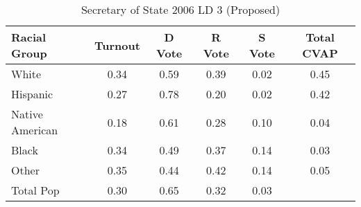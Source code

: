 \begin{table}[htb]
\begin{center}
\caption{Secretary of State 2006 LD 3 (Proposed)}
\label{sos06_cvap_ld_3}
\begin{tabular}{lccccc}
  \hline
Racial Group & Turnout & D Vote & R Vote & S Vote & Total CVAP \\ 
  \hline
White & 0.34 & 0.59 & 0.39 & 0.02 & 0.45 \\ 
  Hispanic & 0.27 & 0.78 & 0.20 & 0.02 & 0.42 \\ 
  Native American & 0.18 & 0.61 & 0.28 & 0.10 & 0.04 \\ 
  Black & 0.34 & 0.49 & 0.37 & 0.14 & 0.03 \\ 
  Other & 0.35 & 0.44 & 0.42 & 0.14 & 0.05 \\ 
  Total Pop & 0.30 & 0.65 & 0.32 & 0.03 &  \\ 
   \hline
\end{tabular}
\end{center}
\end{table}
